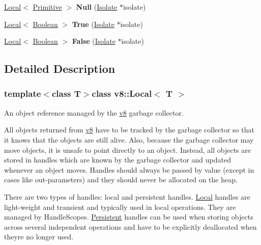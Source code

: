 \begin{DoxyCompactItemize}
\item 
\hypertarget{classv8_1_1Local_a6a29184b023bde58d4af2bba2d249a35}{}\hyperlink{classv8_1_1Local}{Local}$<$ \hyperlink{classv8_1_1Primitive}{Primitive} $>$ {\bfseries Null} (\hyperlink{classv8_1_1Isolate}{Isolate} $\ast$isolate)\label{classv8_1_1Local_a6a29184b023bde58d4af2bba2d249a35}

\item 
\hypertarget{classv8_1_1Local_aa5944f05409b5572b14793eff33a7908}{}\hyperlink{classv8_1_1Local}{Local}$<$ \hyperlink{classv8_1_1Boolean}{Boolean} $>$ {\bfseries True} (\hyperlink{classv8_1_1Isolate}{Isolate} $\ast$isolate)\label{classv8_1_1Local_aa5944f05409b5572b14793eff33a7908}

\item 
\hypertarget{classv8_1_1Local_ae8e414a3a8b3e1f2fa60c24e4dda0c4a}{}\hyperlink{classv8_1_1Local}{Local}$<$ \hyperlink{classv8_1_1Boolean}{Boolean} $>$ {\bfseries False} (\hyperlink{classv8_1_1Isolate}{Isolate} $\ast$isolate)\label{classv8_1_1Local_ae8e414a3a8b3e1f2fa60c24e4dda0c4a}

\end{DoxyCompactItemize}


\subsection{Detailed Description}
\subsubsection*{template$<$class T$>$class v8\+::\+Local$<$ T $>$}

An object reference managed by the \hyperlink{namespacev8}{v8} garbage collector.

All objects returned from \hyperlink{namespacev8}{v8} have to be tracked by the garbage collector so that it knows that the objects are still alive. Also, because the garbage collector may move objects, it is unsafe to point directly to an object. Instead, all objects are stored in handles which are known by the garbage collector and updated whenever an object moves. Handles should always be passed by value (except in cases like out-\/parameters) and they should never be allocated on the heap.

There are two types of handles\+: local and persistent handles. \hyperlink{classv8_1_1Local}{Local} handles are light-\/weight and transient and typically used in local operations. They are managed by Handle\+Scopes. \hyperlink{classv8_1_1Persistent}{Persistent} handles can be used when storing objects across several independent operations and have to be explicitly deallocated when they\textquotesingle{}re no longer used.

